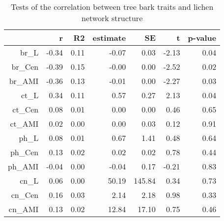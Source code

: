 \begin{table}[ht]
\centering
\begin{tabular}{rrrrrrr}
  \hline
 & r & R2 & estimate & SE & t & p-value \\ 
  \hline
br\_L & -0.34 & 0.11 & -0.07 & 0.03 & -2.13 & 0.04 \\ 
  br\_Cen & -0.39 & 0.15 & -0.00 & 0.00 & -2.52 & 0.02 \\ 
  br\_AMI & -0.36 & 0.13 & -0.01 & 0.00 & -2.27 & 0.03 \\ 
  ct\_L & 0.34 & 0.11 & 0.57 & 0.27 & 2.13 & 0.04 \\ 
  ct\_Cen & 0.08 & 0.01 & 0.00 & 0.00 & 0.46 & 0.65 \\ 
  ct\_AMI & 0.02 & 0.00 & 0.00 & 0.03 & 0.12 & 0.91 \\ 
  ph\_L & 0.08 & 0.01 & 0.67 & 1.41 & 0.48 & 0.64 \\ 
  ph\_Cen & 0.13 & 0.02 & 0.02 & 0.02 & 0.78 & 0.44 \\ 
  ph\_AMI & -0.04 & 0.00 & -0.04 & 0.17 & -0.21 & 0.83 \\ 
  cn\_L & 0.06 & 0.00 & 50.19 & 145.84 & 0.34 & 0.73 \\ 
  cn\_Cen & 0.16 & 0.03 & 2.14 & 2.18 & 0.98 & 0.33 \\ 
  cn\_AMI & 0.13 & 0.02 & 12.84 & 17.10 & 0.75 & 0.46 \\ 
   \hline
\end{tabular}
\caption{Tests of the correlation between tree bark traits and lichen network structure} 
\label{tab:trait_path}
\end{table}
